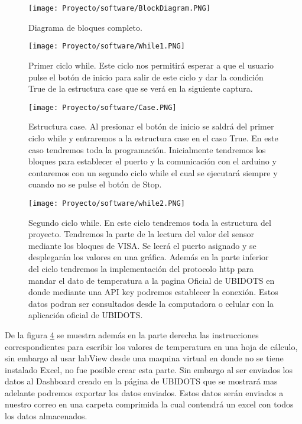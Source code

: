 \begin{figure}[!h]
\centering
\texttt{[image: Proyecto/software/BlockDiagram.PNG]}
\caption{Diagrama de bloques completo.}
\label{FrontPanel}
\end{figure}


\begin{figure}[!h]
\centering
\texttt{[image: Proyecto/software/While1.PNG]}
\caption{Primer ciclo while. Este ciclo nos permitirá esperar a que el usuario pulse el botón de inicio para salir de este ciclo y dar la condición True de la estructura case que se verá en la siguiente captura.}
\label{while1}
\end{figure}

\clearpage

\begin{figure}[!h]
\centering
\texttt{[image: Proyecto/software/Case.PNG]}
\caption{Estructura case. Al presionar el botón de inicio se saldrá del primer ciclo while y entraremos a la estructura case en el caso True. En este caso tendremos toda la programación. Inicialmente tendremos los bloques para establecer el puerto y la comunicación con el arduino y contaremos con un segundo ciclo while el cual se ejecutará siempre y cuando no se pulse el botón de Stop.}
\label{case}
\end{figure}

\begin{figure}[!h]
\centering
\texttt{[image: Proyecto/software/while2.PNG]}
\caption{Segundo ciclo while. En este ciclo tendremos toda la estructura del proyecto. Tendremos la parte de la lectura del valor del sensor mediante los bloques de VISA. Se leerá el puerto asignado y se desplegarán los valores en una gráfica. Además en la parte inferior del ciclo tendremos la implementación del protocolo http para mandar el dato de temperatura a la pagina Oficial de UBIDOTS en donde mediante una API key podremos establecer la conexión. Estos datos podran ser consultados desde la computadora o celular con la aplicación oficial de UBIDOTS.}
\label{while2}
\end{figure}
\clearpage

De la figura \ref{while2} se muestra además en la parte derecha las instrucciones correspondientes para escribir los valores de temperatura en una hoja de cálculo, sin embargo al usar labView desde una maquina virtual en donde no se tiene instalado Excel, no fue posible crear esta parte. Sin embargo al ser enviados los datos al Dashboard creado en la página de UBIDOTS que se mostrará mas adelante podremos exportar los datos enviados. Estos datos serán enviados a nuestro correo en una carpeta comprimida la cual contendrá un excel con todos los datos almacenados.\\

